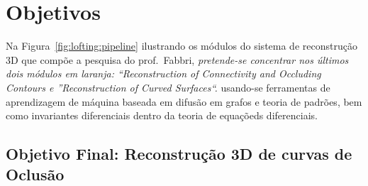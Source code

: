 \documentclass[a4paper,titlepage]{article}
\begin{document}
\section{Objetivos}

Na Figura~\ref{fig:lofting:pipeline} ilustrando os módulos do sistema de
reconstrução 3D que compõe a pesquisa do prof.\ Fabbri, \emph{pretende-se concentrar
nos últimos dois módulos em laranja: ``Reconstruction of Connectivity and
Occluding Contours e ''Reconstruction of Curved Surfaces``.}
usando-se ferramentas de aprendizagem de máquina baseada em
difusão em grafos e teoria de padrões, bem como invariantes diferenciais dentro
da teoria de equaçõeds diferenciais.


\subsection{Objetivo Final: Reconstrução 3D de curvas de Oclusão}
\end{document}
